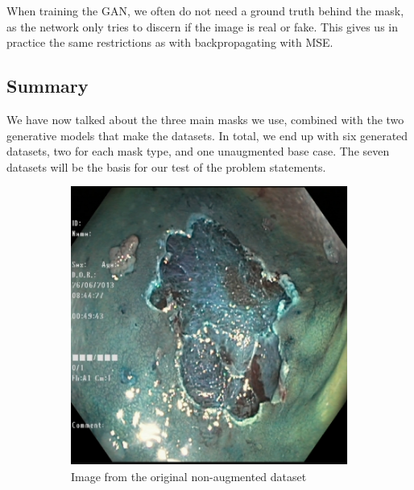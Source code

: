 When training the GAN, we often do not need a ground truth behind the mask, as the network only tries to discern if the image is real or fake. This gives us in practice the same restrictions as with backpropagating with MSE.

\subsection{Summary}
We have now talked about the three main masks we use, combined with the two generative models that make the datasets.
In total, we end up with six generated datasets, two for each mask type, and one unaugmented base case.
The seven datasets will be the basis for our test of the problem statements. 



\begin{figure}[h]
     \centering
     \begin{subfigure}[t]{0.37\textwidth}
         \centering
         \includegraphics[width=\textwidth]{methodology/figures/nomask.png}
         \caption{Image from the original non-augmented dataset}
         \label{fig:CornerMask}
     \end{subfigure}
     \hspace*{2cm}
     \begin{subfigure}[t]{0.37\textwidth}

\end{subfigure}
\end{figure}
